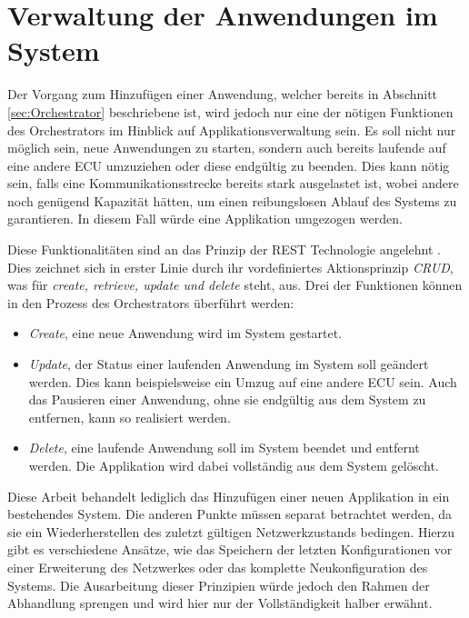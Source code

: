 \section{Verwaltung der Anwendungen im System} \label{sec:REST}
Der Vorgang zum Hinzufügen einer Anwendung, welcher bereits in Abschnitt \ref{sec:Orchestrator} beschriebene ist, wird jedoch nur eine der nötigen Funktionen des Orchestrators im Hinblick auf Applikationsverwaltung sein. Es soll nicht nur möglich sein, neue Anwendungen zu starten, sondern auch bereits laufende auf eine andere \acs{ECU} umzuziehen oder diese endgültig zu beenden. Dies kann nötig sein, falls eine Kommunikationsstrecke bereits stark ausgelastet ist, wobei andere noch genügend Kapazität hätten, um einen reibungslosen Ablauf des Systems zu garantieren. In diesem Fall würde eine Applikation umgezogen werden.

Diese Funktionalitäten sind an das Prinzip der \acf{REST} Technologie angelehnt \cite{Rest}. Dies zeichnet sich in erster Linie durch ihr vordefiniertes Aktionsprinzip \emph{CRUD}, was für \emph{create, retrieve, update und delete} steht, aus. Drei der Funktionen können in den Prozess des Orchestrators überführt werden:
\begin{itemize}
	\item \emph{Create}, eine neue Anwendung wird im System gestartet. 
	\item \emph{Update}, der Status einer laufenden Anwendung im System soll geändert werden. Dies kann beispielsweise ein Umzug auf eine andere \acs{ECU} sein. Auch das Pausieren einer Anwendung, ohne sie endgültig aus dem System zu entfernen, kann so realisiert werden.
	\item \emph{Delete}, eine laufende Anwendung soll im System beendet und entfernt werden. Die Applikation wird dabei vollständig aus dem System gelöscht.
\end{itemize}

Diese Arbeit behandelt lediglich das Hinzufügen einer neuen Applikation in ein bestehendes System. Die anderen Punkte müssen separat betrachtet werden, da sie ein Wiederherstellen des zuletzt gültigen Netzwerkzustands bedingen. Hierzu gibt es verschiedene Ansätze, wie das Speichern der letzten Konfigurationen vor einer Erweiterung des Netzwerkes oder das komplette Neukonfiguration des Systems. Die Ausarbeitung dieser Prinzipien würde jedoch den Rahmen der Abhandlung sprengen und wird hier nur der Vollständigkeit halber erwähnt. 
\newpage

 